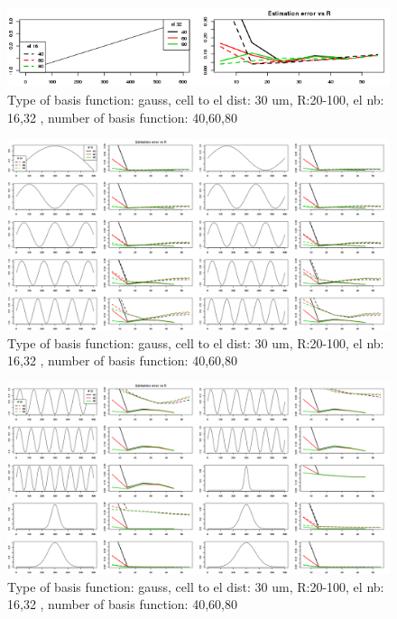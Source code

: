 \documentclass[12pt,a4paper]{article}
\begin{document}
\begin{figure}[h]
\includegraphics[width=15cm]{plots/error_Rtest_gauss2_patt1_el_both.png}
\caption{Type of basis function: gauss, cell to el dist: 30 um, R:20-100, el nb: 16,32 , number of basis function: 40,60,80}
\label{fig:error_gauss0}
\end{figure}


\begin{figure}[h]
\includegraphics[width=15cm]{plots/error_Rtest_gauss2_patt3_12_el_both.png}
\caption{Type of basis function: gauss, cell to el dist: 30 um, R:20-100, el nb: 16,32 , number of basis function: 40,60,80}
\label{fig:error_gauss}
\end{figure}

\begin{figure}[h]
\includegraphics[width=15cm]{plots/error_Rtest_gauss2_patt13_22_el_both.png}
\caption{Type of basis function: gauss, cell to el dist: 30 um, R:20-100, el nb: 16,32 , number of basis function: 40,60,80}
\label{fig:error_gauss2}
\end{figure}
\end{document}
